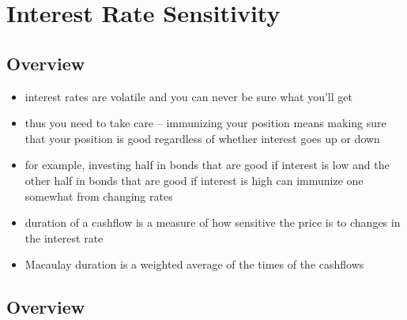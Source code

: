 \documentclass[../00_main.tex]{subfiles}
\begin{document}
\section{Interest Rate Sensitivity}

\subsection{Overview}

\begin{itemize}
    \item interest rates are volatile and you can never be sure what you'll get
    \item thus you need to take care -- immunizing your position means making
        sure that your position is good regardless of whether interest goes up
        or down
    \item for example, investing half in bonds that are good if interest is low
        and the other half in bonds that are good if interest is high can
        immunize one somewhat from changing rates
    \item duration of a cashflow is a measure of how sensitive the price is to
        changes in the interest rate
    \item Macaulay duration is a weighted average of the times of the cashflows
\end{itemize}

\subsection{Overview}
\end{document}
